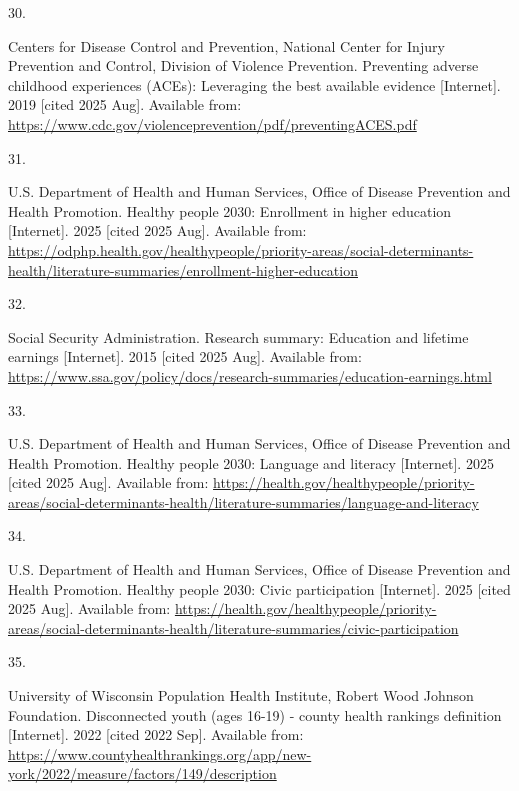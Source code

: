 \documentclass[
  english,
  letterpaper,
]{report}
\newlength{\cslhangindent}
\newlength{\csllabelwidth}
\newenvironment{CSLReferences}[2] %
 {\begin{list}{}{%
  \setlength{\itemindent}{0pt}
  \setlength{\leftmargin}{0pt}
  \setlength{\parsep}{0pt}
  \ifodd #1
   \setlength{\leftmargin}{\cslhangindent}
   \setlength{\itemindent}{-1\cslhangindent}
  \fi
  \setlength{\itemsep}{#2\baselineskip}}}
 {\end{list}}
\newcommand{\CSLLeftMargin}[1]{\parbox[t]{\csllabelwidth}{\strut#1\strut}}
\newcommand{\CSLRightInline}[1]{\parbox[t]{\linewidth - \csllabelwidth}{\strut#1\strut}}
\begin{document}
\begin{CSLReferences}{0}{1}
\CSLLeftMargin{30. }%
\CSLRightInline{Centers for Disease Control and Prevention, National
Center for Injury Prevention and Control, Division of Violence
Prevention. Preventing adverse childhood experiences (ACEs): Leveraging
the best available evidence {[}Internet{]}. 2019 {[}cited 2025 Aug{]}.
Available from:
\url{https://www.cdc.gov/violenceprevention/pdf/preventingACES.pdf}}

\CSLLeftMargin{31. }%
\CSLRightInline{U.S. Department of Health and Human Services, Office of
Disease Prevention and Health Promotion. Healthy people 2030: Enrollment
in higher education {[}Internet{]}. 2025 {[}cited 2025 Aug{]}. Available
from:
\url{https://odphp.health.gov/healthypeople/priority-areas/social-determinants-health/literature-summaries/enrollment-higher-education}}

\CSLLeftMargin{32. }%
\CSLRightInline{Social Security Administration. Research summary:
Education and lifetime earnings {[}Internet{]}. 2015 {[}cited 2025
Aug{]}. Available from:
\url{https://www.ssa.gov/policy/docs/research-summaries/education-earnings.html}}

\CSLLeftMargin{33. }%
\CSLRightInline{U.S. Department of Health and Human Services, Office of
Disease Prevention and Health Promotion. Healthy people 2030: Language
and literacy {[}Internet{]}. 2025 {[}cited 2025 Aug{]}. Available from:
\url{https://health.gov/healthypeople/priority-areas/social-determinants-health/literature-summaries/language-and-literacy}}

\CSLLeftMargin{34. }%
\CSLRightInline{U.S. Department of Health and Human Services, Office of
Disease Prevention and Health Promotion. Healthy people 2030: Civic
participation {[}Internet{]}. 2025 {[}cited 2025 Aug{]}. Available from:
\url{https://health.gov/healthypeople/priority-areas/social-determinants-health/literature-summaries/civic-participation}}

\CSLLeftMargin{35. }%
\CSLRightInline{University of Wisconsin Population Health Institute,
Robert Wood Johnson Foundation. Disconnected youth (ages 16-19) - county
health rankings definition {[}Internet{]}. 2022 {[}cited 2022 Sep{]}.
Available from:
\url{https://www.countyhealthrankings.org/app/new-york/2022/measure/factors/149/description}}


\end{CSLReferences}
\end{document}
